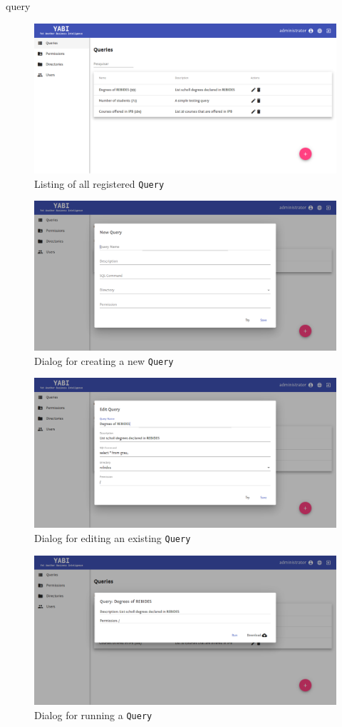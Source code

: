 query
\begin{figure}
  \centering
  \includegraphics[width=.8\textwidth]{images/screenshots/query/query-listing}
  \caption{Listing of all registered \texttt{Query}}\label{fig:querylist}
\end{figure}

\begin{figure}
  \centering
  \includegraphics[width=.8\textwidth]{images/screenshots/query/query-new}
  \caption{Dialog for creating a new \texttt{Query}}\label{fig:querynew}
\end{figure}

\begin{figure}
  \centering
  \includegraphics[width=.8\textwidth]{images/screenshots/query/query-edit}
  \caption{Dialog for editing an existing \texttt{Query}}\label{fig:queryedit}
\end{figure}

\begin{figure}
  \centering
  \includegraphics[width=.8\textwidth]{images/screenshots/query/query-pre-run}
  \caption{Dialog for running a \texttt{Query}}\label{fig:queryprerun}
\end{figure}

